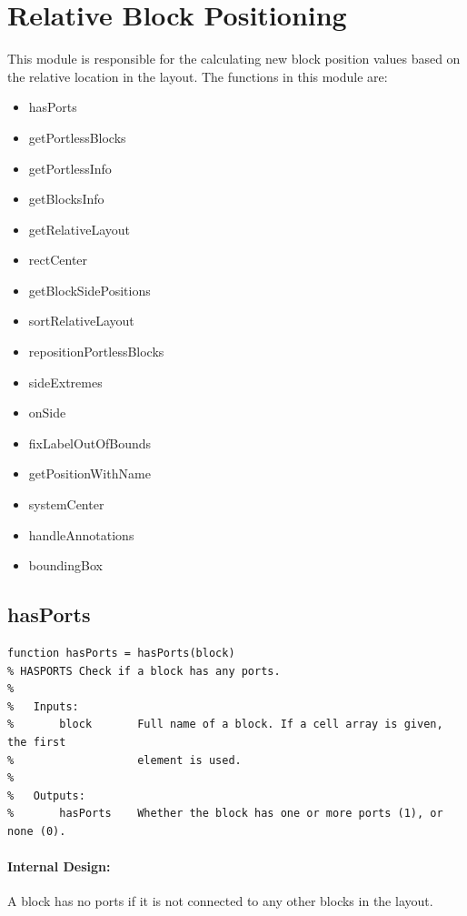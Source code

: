 \documentclass[12pt,letterpaper]{report}
\begin{document}
\section{Relative Block Positioning}
\par This module is responsible for the calculating new block position values based on the relative location in the layout. The functions in this module are:
\begin{itemize}
	\item hasPorts
	\item getPortlessBlocks
	\item getPortlessInfo
	\item getBlocksInfo
	\item getRelativeLayout
	\item rectCenter
	\item getBlockSidePositions
	\item sortRelativeLayout
	\item repositionPortlessBlocks
	\item sideExtremes
	\item onSide
	\item fixLabelOutOfBounds
	\item getPositionWithName
	\item systemCenter
	\item handleAnnotations
	\item boundingBox
\end{itemize}

\subsection{hasPorts} \label{hasPorts}
\begin{lstlisting}
function hasPorts = hasPorts(block)
% HASPORTS Check if a block has any ports.
%
%   Inputs:
%       block       Full name of a block. If a cell array is given, the first
%                   element is used.
%
%   Outputs:
%       hasPorts    Whether the block has one or more ports (1), or none (0).
\end{lstlisting}
\paragraph{Internal Design:} A block has no ports if it is not connected to any other blocks in the layout.
\end{document}
